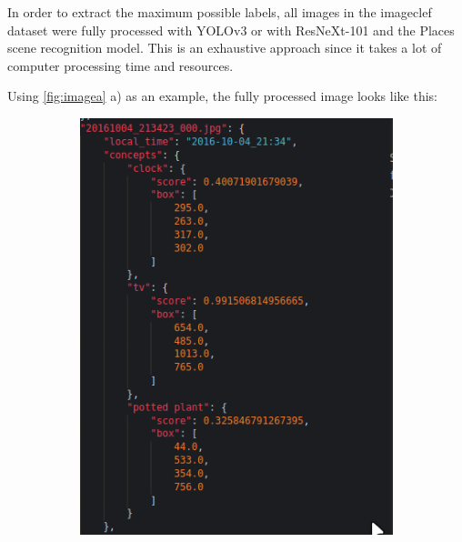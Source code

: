    In order to extract the maximum possible labels, all images in the imageclef dataset were fully processed with YOLOv3 or with ResNeXt-101 and the Places scene recognition model. This is an exhaustive approach since it takes a lot of computer processing time and resources. 
    
    Using \ref{fig:imagea} a) as an example, the fully processed image looks like this:
    
    \begin{figure}[H]
      \centering
      \captionsetup{justification=centering}
  
      \begin{subfigure}{0.395\textwidth}
      
      \includegraphics[width=\textwidth]{Sections/4InitialWork/4_images_random/process1.png} 
      \end{subfigure}
      \begin{subfigure}{0.49\textwidth}

\end{subfigure}
\end{figure}
